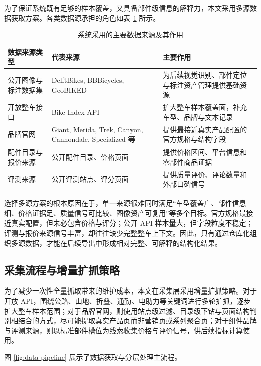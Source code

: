 \documentclass[12pt,hyperref,a4paper,UTF8]{ctexart}
\begin{document}
为了保证系统既有足够的样本覆盖，又具备部件级信息的解释力，本文采用多源数据获取方案。各类数据源承担的角色如表 \ref{tab:sources} 所示。

\begin{table}[H]
    \centering
    \small
    \begin{tabular}{p{3.2cm} p{4.2cm} p{5.5cm}}
        \toprule
        数据来源类型 & 代表来源 & 主要作用 \\
        \midrule
        公开图像与标注数据集 & DelftBikes, BBBicycles, GeoBIKED & 为后续视觉识别、部件定位与标注资产管理提供基础资源 \\
        开放整车接口 & Bike Index API & 扩大整车样本覆盖面，补充车型、品牌与文本记录 \\
        品牌官网 & Giant, Merida, Trek, Canyon, Cannondale, Specialized 等 & 提供最接近真实产品配置的官方规格与结构字段 \\
        配件目录与报价来源 & 公开配件目录、价格页面 & 提供价格区间、平台信息和零部件商品证据 \\
        评测来源 & 公开评测站点、评分页面 & 提供质量评价、评论数量和外部口碑信号 \\
        \bottomrule
    \end{tabular}
    \caption{系统采用的主要数据来源及其作用}
    \label{tab:sources}
\end{table}

选择多源方案的根本原因在于，单一来源很难同时满足“车型覆盖广、部件信息细、价格证据足、质量信号可比较、图像资产可复用”等多个目标。官方规格最接近真实配置，但未必包含价格与评分；公开 API 样本量大，但字段粒度不稳定；评测与报价来源信号丰富，却往往缺少完整整车上下文。因此，只有通过仓库化组织多源数据，才能在后续导出中形成相对完整、可解释的结构化结果。

\subsection{采集流程与增量扩抓策略}

为了减少一次性全量抓取带来的维护成本，本文在采集层采用增量扩抓策略。对于开放 API，围绕公路、山地、折叠、通勤、电助力等关键词进行多轮扩抓，逐步扩大整车样本范围；对于品牌官网，则使用站点级过滤、目录级下钻与页面结构判别相结合的方式，尽可能提取真实产品页而非营销页或系列聚合页；对于组件品牌与评测来源，则以标准部件槽位为线索收集价格与评价信号，供后续指标计算使用。

图 \ref{fig:data-pipeline} 展示了数据获取与分层处理主流程。
\end{document}
